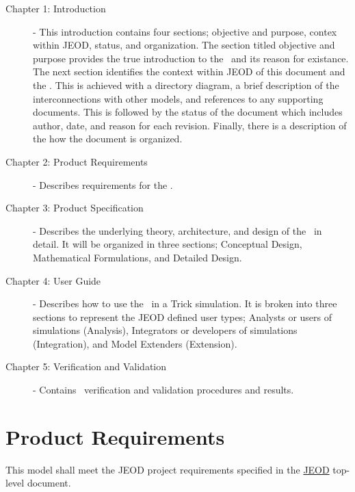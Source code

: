 \begin{description}

\item[Chapter 1: Introduction] - 
This introduction contains four sections; objective and purpose, contex within JEOD, status, and organization.  
The section titled objective and purpose provides the true introduction to the \ModelNameDesc\ and its reason 
for existance.  The next section identifies the context within JEOD of this document and the \ModelNameDesc.  
This is achieved with a directory diagram, a brief description of the interconnections with other models, and 
references to any supporting documents.  This is followed by the status of the document which includes
author, date, and reason for each revision.  Finally, there is a description of the how the document is organized.

\item[Chapter 2: Product Requirements] - 
Describes requirements for the \ModelNameDesc.

\item[Chapter 3: Product Specification] - 
Describes the underlying theory, architecture, and design of the \ModelNameDesc\ in detail.  It will be organized in 
three sections; Conceptual Design, Mathematical Formulations, and Detailed Design.

\item[Chapter 4: User Guide] - 
Describes how to use the \ModelNameDesc\ in a Trick simulation.  It is broken into three sections to represent the JEOD 
defined user types; Analysts or users of simulations (Analysis), Integrators or developers of simulations (Integration), 
and Model Extenders (Extension).

\item[Chapter 5: Verification and Validation] -  
Contains \ModelNameDesc\ verification and validation procedures and results.

\end{description}

\chapter{Product Requirements}\label{ch:reqt}
This model shall meet the JEOD project requirements specified in the 
\hyperref{file:\JEODHOME/docs/JEOD.pdf}{part1}{reqt}{JEOD} top-level document.

